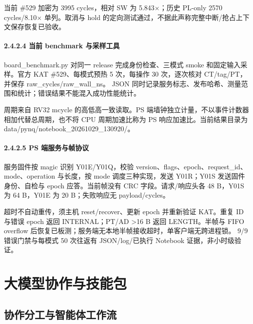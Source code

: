 当前 \#529 加密为 3995 cycles，相对 SW 为 5.843$\times$；历史 PL-only 2570 cycles/8.10$\times$ 单列。取消与 hold 的定向测试通过，不据此声称完整中断/抢占上下文保存恢复已验收。

\Needspace{85pt}

\paragraph{2.4.2.4 当前 benchmark 与采样工具}\label{ux5f53ux524d-benchmark-ux4e0eux91c7ux6837ux5de5ux5177}

board\_benchmark.py 对同一 release 完成身份检查、三模式 smoke 和固定输入采样。官方 KAT \#529、每模式预热 5 次，每操作 30 次，逐次核对 CT/tag/PT，并保存 raw\_cycles/raw\_wall\_ns。 JSON 同时记录服务标志、发布哈希、测量范围和统计；错误结果不能混入成功性能统计。

周期来自 RV32 mcycle 的高低高一致读取。PS 端墙钟独立计量，不以事件计数器相加代替总周期，也不将 CPU 周期加速比称为 PS 响应加速比。当前结果目录为 data/pynq/notebook\_20261029\_130920/。

\Needspace{85pt}

\paragraph{2.4.2.5 PS 端服务与帧协议}\label{ps-ux7aefux670dux52a1ux4e0eux5e27ux534fux8bae}

服务固件按 magic 识别 Y01E/Y01Q，校验 version、flags、epoch、request\_id、mode、operation 与长度，按 mode 调度三种实现，发送 Y01R；Y01S 发送固件身份、自检与 epoch 应答。当前帧没有 CRC 字段。请求/响应头各 48 B，Y01S 为 64 B，Y01E 为 20 B；失败响应无 payload/cycles。

超时不自动重传，须主机 reset/recover、更新 epoch 并重新验证 KAT。重复 ID 与错误 epoch 返回 INTERNAL；PT/AD \textgreater16 B 返回 LENGTH。半帧与 FIFO overflow 后恢复已板测；服务端无本地半帧接收超时，单客户端无跨进程锁。 9/9 错误门禁与每模式 50 次往返有 JSON/log/已执行 Notebook 证据，非小时级验证。

\Needspace{85pt}

\section{大模型协作与技能包}

\Needspace{85pt}

\subsection{协作分工与智能体工作流}

